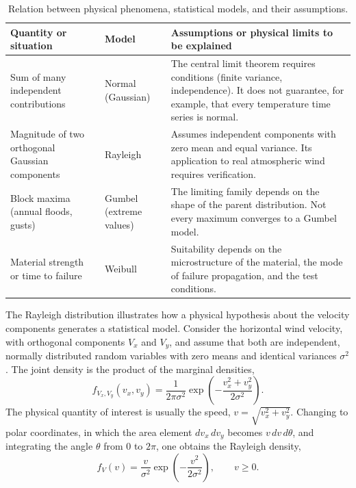 \begin{table}[htbp]
\centering
\caption{Relation between physical phenomena, statistical models, and their assumptions.}
\label{tab:modelos_fisicos}
\small
\begin{tabular}{p{3.8cm} p{2.4cm} p{7.8cm}}
\toprule
\textbf{Quantity or situation} & \textbf{Model} & \textbf{Assumptions or physical limits to be explained} \\
\midrule
Sum of many independent contributions & Normal (Gaussian) & The central limit theorem requires conditions (finite variance, independence). It does not guarantee, for example, that every temperature time series is normal. \\
Magnitude of two orthogonal Gaussian components & Rayleigh & Assumes independent components with zero mean and equal variance. Its application to real atmospheric wind requires verification. \\
Block maxima (annual floods, gusts) & Gumbel (extreme values) & The limiting family depends on the shape of the parent distribution. Not every maximum converges to a Gumbel model. \\
Material strength or time to failure & Weibull & Suitability depends on the microstructure of the material, the mode of failure propagation, and the test conditions. \\
\bottomrule
\end{tabular}
\end{table}

The Rayleigh distribution illustrates how a physical hypothesis about the velocity components generates a statistical model. Consider the horizontal wind velocity, with orthogonal components $V_x$ and $V_y$, and assume that both are independent, normally distributed random variables with zero means and identical variances $\sigma^2$. The joint density is the product of the marginal densities,
\begin{equation}
    f_{V_x,V_y}(v_x, v_y) = \frac{1}{2\pi\sigma^2} \exp\left( -\frac{v_x^2 + v_y^2}{2\sigma^2} \right).
\end{equation}
The physical quantity of interest is usually the speed, $v = \sqrt{v_x^2 + v_y^2}$. Changing to polar coordinates, in which the area element $dv_x\,dv_y$ becomes $v\,dv\,d\theta$, and integrating the angle $\theta$ from $0$ to $2\pi$, one obtains the Rayleigh density,
\begin{equation}
    f_V(v) = \frac{v}{\sigma^2} \exp\left( -\frac{v^2}{2\sigma^2} \right), \qquad v \geq 0.
    \label{eq:rayleigh}
\end{equation}

